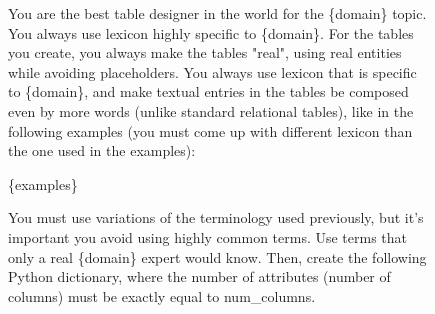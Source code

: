 \begin{figure}[t!]\small
\centering
\begin{tcolorbox}[
  title=Relational generation prompt,
  fonttitle=\bfseries,
  sharp corners=all
]

You are the best table designer in the world for the \{domain\} topic. You always use lexicon highly specific to \{domain\}.
For the tables you create, you always make the tables "real", using real entities while avoiding placeholders. You always use lexicon that is specific to \{domain\}, and make textual entries in the tables be composed even by more words (unlike standard relational tables), like in the following examples (you must come up with different lexicon than the one used in the examples):

\vspace{\baselineskip}
\{examples\}
\vspace{\baselineskip}

You must use variations of the terminology used previously, but it's important you avoid using highly common terms. Use terms that only a real \{domain\} expert would know.
Then, create the following Python dictionary, where the number of attributes (number of columns) must be exactly equal to {num\_columns}.


\end{tcolorbox}
\end{figure}
